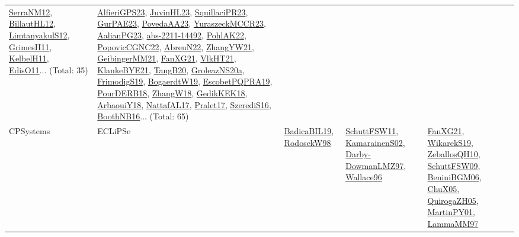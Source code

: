 {\begin{longtable}{lp{3cm}>{\raggedright}p{6cm}>{\raggedright}p{6cm}p{8cm}}
\href{papers/SerraNM12.pdf}{SerraNM12}\cite{SerraNM12}, \href{papers/BillautHL12.pdf}{BillautHL12}\cite{BillautHL12}, \href{articles/LimtanyakulS12.pdf}{LimtanyakulS12}\cite{LimtanyakulS12}, \href{papers/GrimesH11.pdf}{GrimesH11}\cite{GrimesH11}, \href{articles/KelbelH11.pdf}{KelbelH11}\cite{KelbelH11}, \href{papers/EdisO11.pdf}{EdisO11}\cite{EdisO11}... (Total: 35) & \href{articles/AlfieriGPS23.pdf}{AlfieriGPS23}\cite{AlfieriGPS23}, \href{papers/JuvinHL23.pdf}{JuvinHL23}\cite{JuvinHL23}, \href{papers/SquillaciPR23.pdf}{SquillaciPR23}\cite{SquillaciPR23}, \href{articles/GurPAE23.pdf}{GurPAE23}\cite{GurPAE23}, \href{papers/PovedaAA23.pdf}{PovedaAA23}\cite{PovedaAA23}, \href{articles/YuraszeckMCCR23.pdf}{YuraszeckMCCR23}\cite{YuraszeckMCCR23}, \href{papers/AalianPG23.pdf}{AalianPG23}\cite{AalianPG23}, \href{articles/abs-2211-14492.pdf}{abs-2211-14492}\cite{abs-2211-14492}, \href{articles/PohlAK22.pdf}{PohlAK22}\cite{PohlAK22}, \href{papers/PopovicCGNC22.pdf}{PopovicCGNC22}\cite{PopovicCGNC22}, \href{articles/AbreuN22.pdf}{AbreuN22}\cite{AbreuN22}, \href{articles/ZhangYW21.pdf}{ZhangYW21}\cite{ZhangYW21}, \href{papers/GeibingerMM21.pdf}{GeibingerMM21}\cite{GeibingerMM21}, \href{articles/FanXG21.pdf}{FanXG21}\cite{FanXG21}, \href{articles/VlkHT21.pdf}{VlkHT21}\cite{VlkHT21}, \href{papers/KlankeBYE21.pdf}{KlankeBYE21}\cite{KlankeBYE21}, \href{papers/TangB20.pdf}{TangB20}\cite{TangB20}, \href{papers/GroleazNS20a.pdf}{GroleazNS20a}\cite{GroleazNS20a}, \href{papers/FrimodigS19.pdf}{FrimodigS19}\cite{FrimodigS19}, \href{papers/BogaerdtW19.pdf}{BogaerdtW19}\cite{BogaerdtW19}, \href{articles/EscobetPQPRA19.pdf}{EscobetPQPRA19}\cite{EscobetPQPRA19}, \href{articles/PourDERB18.pdf}{PourDERB18}\cite{PourDERB18}, \href{articles/ZhangW18.pdf}{ZhangW18}\cite{ZhangW18}, \href{articles/GedikKEK18.pdf}{GedikKEK18}\cite{GedikKEK18}, \href{papers/ArbaouiY18.pdf}{ArbaouiY18}\cite{ArbaouiY18}, \href{articles/NattafAL17.pdf}{NattafAL17}\cite{NattafAL17}, \href{papers/Pralet17.pdf}{Pralet17}\cite{Pralet17}, \href{papers/SzerediS16.pdf}{SzerediS16}\cite{SzerediS16}, \href{papers/BoothNB16.pdf}{BoothNB16}\cite{BoothNB16}... (Total: 65)\\
CPSystems & ECLiPSe & \href{papers/BadicaBIL19.pdf}{BadicaBIL19}\cite{BadicaBIL19}, \href{papers/RodosekW98.pdf}{RodosekW98}\cite{RodosekW98} & \href{articles/SchuttFSW11.pdf}{SchuttFSW11}\cite{SchuttFSW11}, \href{papers/KamarainenS02.pdf}{KamarainenS02}\cite{KamarainenS02}, \href{articles/Darby-DowmanLMZ97.pdf}{Darby-DowmanLMZ97}\cite{Darby-DowmanLMZ97}, \href{articles/Wallace96.pdf}{Wallace96}\cite{Wallace96} & \href{articles/FanXG21.pdf}{FanXG21}\cite{FanXG21}, \href{articles/WikarekS19.pdf}{WikarekS19}\cite{WikarekS19}, \href{articles/ZeballosQH10.pdf}{ZeballosQH10}\cite{ZeballosQH10}, \href{papers/SchuttFSW09.pdf}{SchuttFSW09}\cite{SchuttFSW09}, \href{papers/BeniniBGM06.pdf}{BeniniBGM06}\cite{BeniniBGM06}, \href{papers/ChuX05.pdf}{ChuX05}\cite{ChuX05}, \href{papers/QuirogaZH05.pdf}{QuirogaZH05}\cite{QuirogaZH05}, \href{articles/MartinPY01.pdf}{MartinPY01}\cite{MartinPY01}, \href{articles/LammaMM97.pdf}{LammaMM97}\cite{LammaMM97}\\

\end{longtable}}

